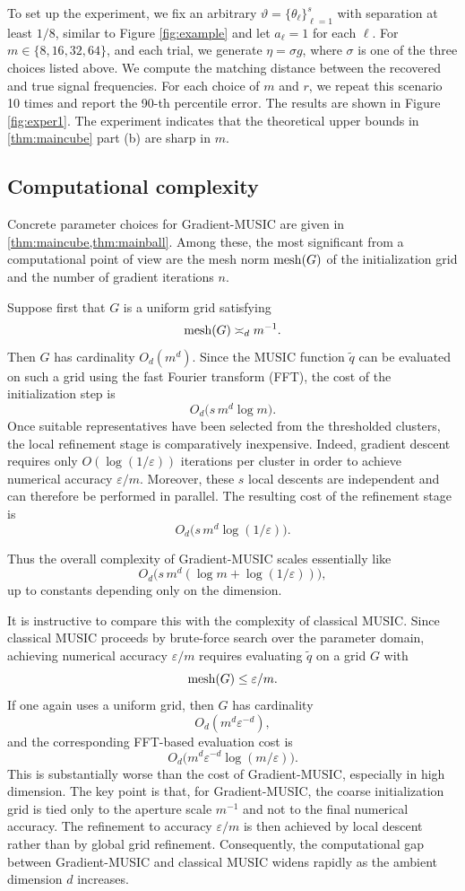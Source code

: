 \documentclass[11pt]{article}
\theoremstyle{definition}
\numberwithin{theorem}{section}
\numberwithin{lemma}{section}
\numberwithin{equation}{section}
\renewcommand{\tilde}{\widetilde}
\renewcommand{\epsilon}{\varepsilon}
\newcommand{\mesh}{{\rm mesh}}
\numberwithin{equation}{section}
\begin{document}
    To set up the experiment, we fix an arbitrary $\vartheta=\{\theta_\ell\}_{\ell=1}^s$ with separation at least $1/8$, similar to Figure \ref{fig:example} and let $a_\ell=1$ for each $\ell$. For $m\in \{8,16,32,64\}$, and each trial, we generate $\eta=\sigma g$, where $\sigma$ is one of the three choices listed above. We compute the matching distance between the recovered and true signal frequencies. For each choice of $m$ and $r$, we repeat this scenario 10 times and report the 90-th percentile error. The results are shown in Figure \cref{fig:exper1}. The experiment indicates that the theoretical upper bounds in  \cref{thm:maincube} part (b) are sharp in $m$.
    
    \subsection{Computational complexity}
\label{sec:complexity1}

Concrete parameter choices for Gradient-MUSIC are given in \cref{thm:maincube,thm:mainball}. Among these, the most significant from a computational point of view are the mesh norm $\mesh(G)$ of the initialization grid and the number of gradient iterations $n$.

Suppose first that $G$ is a uniform grid satisfying
\[
\mesh(G)\asymp_d m^{-1}.
\]
Then $G$ has cardinality $O_d(m^d)$. Since the MUSIC function $\tilde q$ can be evaluated on such a grid using the fast Fourier transform (FFT), the cost of the initialization step is
\[
O_d\bigl(s\,m^d\log m\bigr).
\]
Once suitable representatives have been selected from the thresholded clusters, the local refinement stage is comparatively inexpensive. Indeed, gradient descent requires only $O(\log(1/\epsilon))$ iterations per cluster in order to achieve numerical accuracy $\epsilon/m$. Moreover, these $s$ local descents are independent and can therefore be performed in parallel. The resulting cost of the refinement stage is
\[
O_d\bigl(s\,m^d\log(1/\epsilon)\bigr).
\]

Thus the overall complexity of Gradient-MUSIC scales essentially like
\[
O_d\bigl(s\,m^d(\log m+\log(1/\epsilon))\bigr),
\]
up to constants depending only on the dimension.

It is instructive to compare this with the complexity of classical MUSIC. Since classical MUSIC proceeds by brute-force search over the parameter domain, achieving numerical accuracy $\epsilon/m$ requires evaluating $\tilde q$ on a grid $G$ with
\[
\mesh(G)\le \epsilon/m.
\]
If one again uses a uniform grid, then $G$ has cardinality
\[
O_d(m^d\epsilon^{-d}),
\]
and the corresponding FFT-based evaluation cost is
\[
O_d\bigl(m^d\epsilon^{-d}\log(m/\epsilon)\bigr).
\]
This is substantially worse than the cost of Gradient-MUSIC, especially in high dimension. The key point is that, for Gradient-MUSIC, the coarse initialization grid is tied only to the aperture scale $m^{-1}$ and not to the final numerical accuracy. The refinement to accuracy $\epsilon/m$ is then achieved by local descent rather than by global grid refinement. Consequently, the computational gap between Gradient-MUSIC and classical MUSIC widens rapidly as the ambient dimension $d$ increases.
\end{document}
